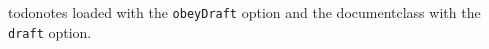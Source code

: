 \documentclass[draft]{article}
\begin{document}
todonotes loaded with the \verb|obeyDraft| option and the
documentclass with the \verb|draft| option.

\listoftodos


\end{document}
